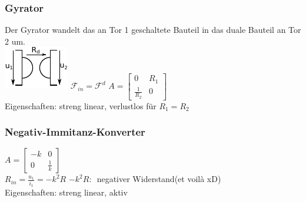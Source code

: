 \documentclass[fs, footer]{latex4ei}
\begin{document}
\begin{multicols*}{4}
		\subsubsection{Gyrator}
		Der Gyrator wandelt das an Tor 1 geschaltete Bauteil in das duale Bauteil an Tor 2 um.\\
		\includegraphics{./img/symb/symb_gyrator.pdf} \qquad $\mathcal F_{in}=\mathcal F^d$
		$A=\begin{bmatrix} 0 & R_1 \\ \frac{1}{R_2} & 0 \end{bmatrix}$\\
		Eigenschaften: streng linear, verlustlos für $R_1=R_2$\\

		\subsubsection{Negativ-Immitanz-Konverter}
		$A=\begin{bmatrix} -k & 0 \\ 0 & \frac{1}{k} \end{bmatrix}$\\
		$R_{in}=\frac{u_1}{i_1}=-k^2R$ \quad $-k^2 R:$\ negativer Widerstand(et voilà xD)\\
		Eigenschaften: streng linear, aktiv



\end{multicols*}
\end{document}
